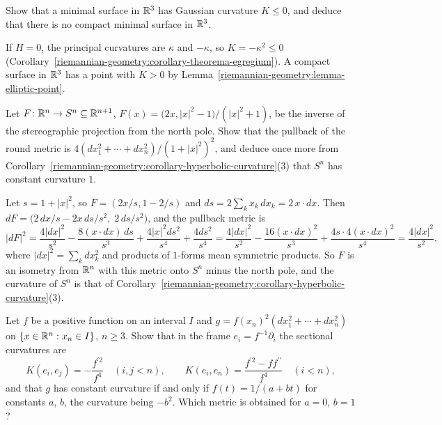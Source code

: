 \begin{exercise}\label{riemannian-geometry:exercise-no-compact-minimal}
Show that a minimal surface in $\mathbb{R}^3$ has Gaussian curvature $K \leq 0$, and deduce that there is no compact minimal surface in $\mathbb{R}^3$.
\end{exercise}

\begin{solution}
If $H = 0$, the principal curvatures are $\kappa$ and $-\kappa$, so $K = -\kappa^2 \leq 0$ (Corollary~\ref{riemannian-geometry:corollary-theorema-egregium}). A compact surface in
$\mathbb{R}^3$ has a point with $K > 0$ by Lemma~\ref{riemannian-geometry:lemma-elliptic-point}.
\end{solution}

\begin{exercise}\label{riemannian-geometry:exercise-stereographic-metric}
Let $F \colon \mathbb{R}^n \to S^n \subseteq \mathbb{R}^{n+1}$, $F(x) = \bigl(2x, |x|^2 - 1\bigr)/(|x|^2 + 1)$, be the inverse of the stereographic projection from the north pole. Show that the pullback of the
round metric is $4(dx_1^2 + \cdots + dx_n^2)/(1 + |x|^2)^2$, and deduce once more from Corollary~\ref{riemannian-geometry:corollary-hyperbolic-curvature}(3) that $S^n$ has constant curvature $1$.
\end{exercise}

\begin{solution}
Let $s = 1 + |x|^2$, so $F = (2x/s, 1 - 2/s)$ and $ds = 2\sum_kx_k\,dx_k = 2\,x \cdot dx$. Then $dF = \bigl(2\,dx/s - 2x\,ds/s^2,\; 2\,ds/s^2\bigr)$, and the pullback metric is
\[
|dF|^2 = \frac{4|dx|^2}{s^2} - \frac{8(x \cdot dx)\,ds}{s^3} + \frac{4|x|^2ds^2}{s^4} + \frac{4ds^2}{s^4} = \frac{4|dx|^2}{s^2} - \frac{16(x \cdot dx)^2}{s^3} + \frac{4s \cdot 4(x \cdot dx)^2}{s^4} = \frac{4|dx|^2}{s^2},
\]
where $|dx|^2 = \sum_kdx_k^2$ and products of $1$-forms mean symmetric products. So $F$ is an isometry from $\mathbb{R}^n$ with this metric onto $S^n$ minus the north pole, and the curvature of $S^n$ is
that of Corollary~\ref{riemannian-geometry:corollary-hyperbolic-curvature}(3).
\end{solution}

\begin{exercise}\label{riemannian-geometry:exercise-metrics-height}
Let $f$ be a positive function on an interval $I$ and $g = f(x_n)^2(dx_1^2 + \cdots + dx_n^2)$ on $\{x \in \mathbb{R}^n : x_n \in I\}$, $n \geq 3$. Show that in the frame $e_i = f^{-1}\partial_i$
the sectional curvatures are
\[
K(e_i, e_j) = -\frac{f^{\prime2}}{f^4}\quad(i, j < n), \qquad K(e_i, e_n) = \frac{f^{\prime2} - ff^{\prime\prime}}{f^4}\quad(i < n),
\]
and that $g$ has constant curvature if and only if $f(t) = 1/(a + bt)$ for constants $a$, $b$, the curvature being $-b^2$. Which metric is obtained for $a = 0$, $b = 1$?
\end{exercise}

